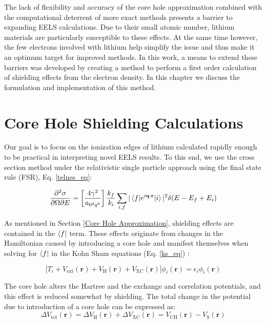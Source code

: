 




The lack of flexibility and accuracy of the core hole approximation combined with the computational deterrent of more exact methods presents a barrier to expanding EELS calculations.  Due to their small atomic number, lithium materials are particularly susceptible to these effects.  At the same time however, the few electrons involved with lithium help simplify the issue and thus make it an optimum target for improved methods.  In this work, a means to extend these barriers was developed by creating a method to perform a first order calculation of shielding effects from the electron density.   In this chapter we discuss the formulation and implementation of this method. 

\section{Core Hole Shielding Calculations}
Our goal is to focus on the ionization edges of lithium calculated rapidly enough to be practical in interpreting novel EELS results.  To this end, we use the cross section method under the relativistic single particle approach using the final state rule (FSR), Eq. \ref{telnes_eq}\cite{jorissen2007ab}:

\begin{equation}
	\frac{\partial^2 \sigma}{\partial \Omega \partial E} = \left[\frac{4\gamma^2}{a_{\mathrm{0}^2q^4}}\right] \frac{k_f}{k_i} \sum_{i,f}|\mel{f}{e^{i\textbf{q}\cdot\textbf{r}}}{i}|^2\delta(E-E_f+E_i)
\end{equation}

As mentioned in Section \ref{Core Hole Approximation}, shielding effects are contained in the $\bra{f}$ term. These effects originate from changes in the Hamiltonian caused by introducing a core hole and manifest themselves when solving for $\bra{f}$ in the Kohn Sham equations (Eq. \ref{ks_eq}) \cite{kohn_self-consistent_1965}:  

\begin{equation}
    \bigg[T_i + V_{\mathrm{ext}}(\textbf{r}) + V_{\mathrm{H}}(\textbf{r}) + V_{\mathrm{XC}}(\textbf{r})\bigg] \phi_i(\textbf{r}) = \epsilon_i \phi_i(\textbf{r})
\end{equation}

The core hole alters the Hartree and the exchange and correlation potentials, and this effect is reduced somewhat by shielding.  The total change in the potential due to introduction of a core hole can be expressed as: 
\begin{equation}
\Delta V_{\mathrm{tot}}(\textbf{r})=\Delta V_{\mathrm{H}}(\textbf{r}) +\Delta V_{\mathrm{XC}}(\textbf{r})=V_{\mathrm{CH}}(\textbf{r}) - V_{\mathrm{S}}(\textbf{r})
\label{delta_potentials}
\end{equation}

